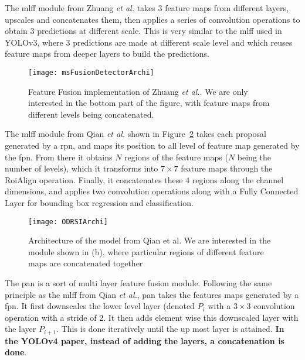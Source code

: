 The \gls{mlff} module from Zhuang \textit{et al.}\cite{zhuang2019} takes 3 feature maps from different layers, upscales and concatenates them, then applies a series of convolution operations to obtain 3 predictions at different scale. This is very similar to the \gls{mlff} used in YOLOv3\cite{yolov3}, where 3 predictions are made at different scale level and which reuses feature maps from deeper layers to build the predictions.

\begin{figure}[H]
	\centering
	\texttt{[image: msFusionDetectorArchi]}
	\caption[Feature Fusion in Zhuang \textit{et al.}]{Feature Fusion implementation of Zhuang \textit{et al.}. We are only interested in the bottom part of the figure, with feature maps from different levels being concatenated.}
	\label{fig:mlffZhuang}
\end{figure}

The \gls{mlff} module from Qian \textit{et al.}\cite{qianAl} shown in Figure~\ref{fig:mlffQian} takes each proposal generated by a \gls{rpn}, and maps its position to all level of feature map generated by the \gls{fpn}. From there it obtains $N$ regions of the feature maps ($N$ being the number of levels), which it transforms into $7 \times 7$ feature maps through the RoiAlign\cite{maskrcnn} operation. Finally, it concatenates these 4 regions along the channel dimensions, and applies two convolution operations along with a Fully Connected Layer for bounding box regression and classification.

\begin{figure}[H]
	\centering
	\texttt{[image: ODRSIArchi]}
	\caption[Architecture of Qian \textit{et al.}]{Architecture of the model from Qian et al. We are interested in the module shown in (b), where particular regions of different feature maps are concatenated together}
	\label{fig:mlffQian}
\end{figure}

The \gls{pan} is a sort of multi layer feature fusion module. Following the same principle as the \gls{mlff} from Qian \textit{et al.}, \gls{pan} takes the features maps generated by a \gls{fpn}. It first downscales the lower level layer (denoted $P_i$ with a $3 \times 3$ convolution operation with a stride of 2. It then adds element wise this downscaled layer with the layer $P_{i+1}$. This is done iteratively until the up most layer is attained. \textbf{In the YOLOv4 paper, instead of adding the layers, a concatenation is done}.

